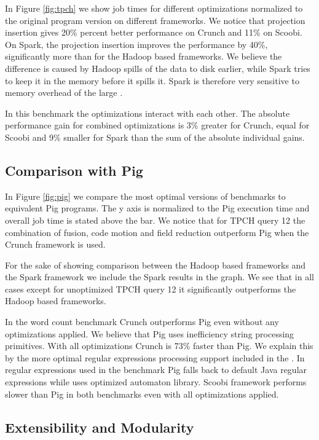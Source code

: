 In Figure \ref{fig:tpch} we show job times for different optimizations normalized to the original program version on different frameworks. We notice that projection insertion gives 20\% percent better performance on Crunch and 11\% on Scoobi. On Spark, the projection insertion improves the performance by 40\%, significantly more than for the Hadoop based frameworks. We believe the difference is caused by Hadoop spills of the data to disk earlier, while Spark tries to keep it in the memory before it spills it. Spark is therefore very sensitive to memory overhead of the large .

In this benchmark the optimizations interact with each other. The absolute performance gain for combined optimizations is 3\% greater for Crunch, equal for Scoobi and 9\% smaller for Spark than the sum of the absolute individual gains.

\subsection{Comparison with Pig}
\label{subsec:pig}

In Figure \ref{fig:pig} we compare the most optimal versions of benchmarks to equivalent Pig programs. The y axis is normalized to the Pig execution time and overall job time is stated above the bar. We notice that for TPCH query 12 the combination of fusion, code motion and field reduction outperform Pig when the Crunch framework is used. 

For the sake of showing comparison between the Hadoop based frameworks and the Spark framework we include the Spark results in the graph. We see that in all cases except for unoptimized TPCH query 12 it significantly outperforms the Hadoop based frameworks.

In the word count benchmark Crunch outperforms Pig even without any optimizations applied. We believe that Pig uses inefficiency string processing primitives. With all optimizations Crunch is 73\% faster than Pig. We explain this by the more optimal regular expressions processing support included in the \tool. In regular expressions used in the benchmark Pig falls back to default Java regular expressions while \tool uses optimized automaton library. Scoobi framework performs slower than Pig in both benchmarks even with all optimizations applied.


\subsection{Extensibility and Modularity}
\label{subsec:kmeans}

